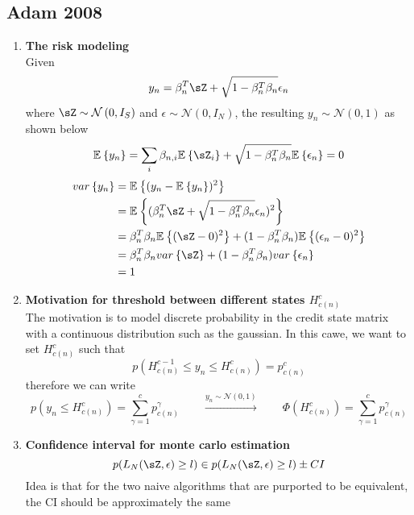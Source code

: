 \documentclass[11pt]{article}
\begin{document}
\renewcommand{\norm}[1]{\left\lVert#1\right\rVert}
\renewcommand{\E}[2][]{\mathbb{E}_{#1}\left\{#2\right\}}
\renewcommand{\var}[2][]{var_{#1}\left\{#2\right\}}
\renewcommand{\cov}[1]{cov\{#1\}} 
\newcommand{\normal}[1]{\mathcal{N}\left(#1\right)}
\newcommand{\exponents}[1]{exp\left\{#1\right\}}
\newcommand{\indicator}[1]{\mathbbm{1}_{#1}}

\renewcommand{\bmu}{\boldsymbol{\mu}}
\renewcommand{\bpi}{\boldsymbol{\pi}}
\newcommand{\bTheta}{\boldsymbol{\Theta}}
\newcommand{\bSigma}{\boldsymbol{\Sigma}}
\renewcommand{\bphi}{\boldsymbol{\phi}}

\subsection*{Adam 2008}

\begin{enumerate}
    \item \textbf{The risk modeling} \\
    Given 
    \[
        y_n = \beta_n^T \sZ + \sqrt{1 - \beta_n^T \beta_n} \epsilon_n
    \]
    where $\sZ \sim \normal{0, I_S}$ and $\epsilon \sim \normal{0, I_N}$, the resulting $y_n \sim \normal{0,1}$ as shown below 
    \[
        \E{y_n} = \sum_{i} \beta_{n,i} \E{\sZ_i} + \sqrt{1 - \beta_n^T \beta_n} \E{\epsilon_n} = 0
    \]
    \begin{align*}
        \var{y_n} 
        &= \E{(y_n - \E{y_n})^2} \\
        &= \E{ (\beta_n^T \sZ + \sqrt{1 - \beta_n^T \beta_n} \epsilon_n)^2 }\\
        &= \beta_n^T \beta_n \E{(\sZ - 0)^2} + (1-\beta_n^T \beta_n) \E{(\epsilon_n - 0)^2} \\
        &= \beta_n^T \beta_n \var{\sZ} + (1-\beta_n^T \beta_n) \var{\epsilon_n} \\
        &= 1
    \end{align*}
    \item \textbf{Motivation for threshold between different states $H_{c(n)}^c$} \\
    The motivation is to model discrete probability in the credit state matrix with a continuous distribution such as the gaussian. In this cawe, we want to set $H_{c(n)}^c$ such that
    \[
        p(H_{c(n)}^{c-1}\leq y_n \leq H_{c(n)}^c) = p_{c(n)}^c
    \]
    therefore we can write 
    \[
        p(y_n \leq H_{c(n)}^c) = \sum_{\gamma = 1}^c p_{c(n)}^{\gamma}
        \qquad 
        \overset{y_n \sim \normal{0,1}}{\longrightarrow} 
        \qquad 
        \Phi(H_{c(n)}^c) = \sum_{\gamma = 1}^c p_{c(n)}^{\gamma}
    \]
    \item \textbf{Confidence interval for monte carlo estimation}
    \[
        p(L_N(\sZ, \epsilon)\geq l) \in 
        p(L_N(\sZ, \epsilon)\geq l) \pm CI
    \]
    Idea is that for the two naive algorithms that are purported to be equivalent, the CI should be approximately the same
\end{enumerate}
\end{document}
